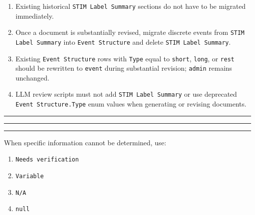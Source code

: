 \begin{tcolorbox}
\smallskip{}\par\smallskip

\begin{enumerate}[leftmargin=1.5em,noitemsep,topsep=2pt]
\item Existing historical \texttt{STIM Label Summary} sections do not have to be migrated immediately.
\item Once a document is substantially revised, migrate discrete events from \texttt{STIM Label Summary} into \texttt{Event Structure} and delete \texttt{STIM Label Summary}.
\item Existing \texttt{Event Structure} rows with \texttt{Type} equal to \texttt{short}, \texttt{long}, or \texttt{rest} should be rewritten to \texttt{event} during substantial revision; \texttt{admin} remains unchanged.
\item LLM review scripts must not add \texttt{STIM Label Summary} or use deprecated \texttt{Event Structure.Type} enum values when generating or revising documents.
\end{enumerate}

\par\bigskip
\noindent\rule{\linewidth}{0.8pt}\par\nopagebreak
{}\par\nopagebreak
\noindent\rule{\linewidth}{0.8pt}\par\smallskip

\medskip{}
\par\nopagebreak\noindent\rule{\linewidth}{0.4pt}\par\smallskip

\smallskip{}\par\smallskip

\noindent When specific information cannot be determined, use:\par\smallskip

\begin{enumerate}[leftmargin=1.5em,noitemsep,topsep=2pt]
\item \texttt{Needs verification}
\item \texttt{Variable}
\item \texttt{N/A}
\item \texttt{null}
\end{enumerate}


\end{tcolorbox}
